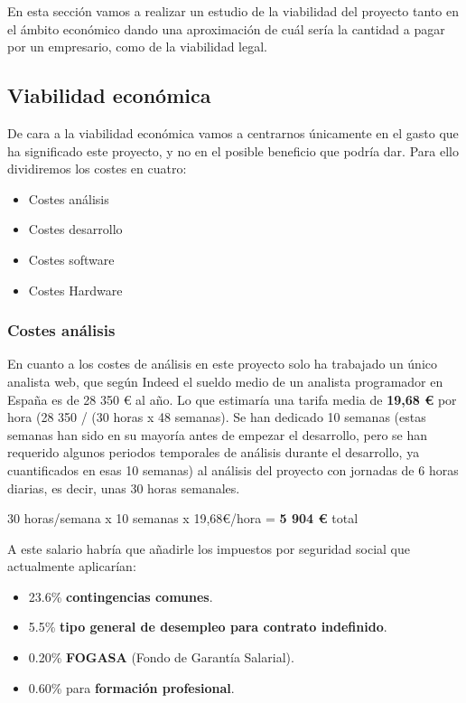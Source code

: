 En esta sección vamos a realizar un estudio de la viabilidad del proyecto tanto en el ámbito económico dando una aproximación de cuál sería la cantidad a pagar por un empresario, como de la viabilidad legal.

\subsection{Viabilidad económica}

De cara a la viabilidad económica vamos a centrarnos únicamente en el gasto que ha significado este proyecto, y no en el posible beneficio que podría dar. Para ello dividiremos los costes en cuatro:

\begin{itemize}
    \item Costes análisis
    \item Costes desarrollo
    \item Costes software
    \item Costes Hardware
\end{itemize}

\subsubsection{Costes análisis}

En cuanto a los costes de análisis en este proyecto solo ha trabajado un único analista web, que según Indeed \cite{indeed:oficial} el sueldo medio de un analista programador en España es de 28 350 € al año. Lo que estimaría una tarifa media de \textbf{19,68 €} por hora (28 350 / (30 horas x 48 semanas). Se han dedicado 10 semanas (estas semanas han sido en su mayoría antes de empezar el desarrollo, pero se han requerido algunos periodos temporales de análisis durante el desarrollo, ya cuantificados en esas 10 semanas)  al análisis del proyecto con jornadas de 6 horas diarias, es decir, unas 30 horas semanales.

30 horas/semana x 10 semanas x 19,68€/hora = \textbf{5 904 €} total

A este salario habría que añadirle los impuestos por seguridad social que actualmente aplicarían:

\begin{itemize}
    \item 23.6\% \textbf{contingencias comunes}.
    \item 5.5\% \textbf{tipo general de desempleo para contrato indefinido}.
    \item 0.20\% \textbf{FOGASA} (Fondo de Garantía Salarial).
    \item 0.60\% para \textbf{formación profesional}.
\end{itemize}

